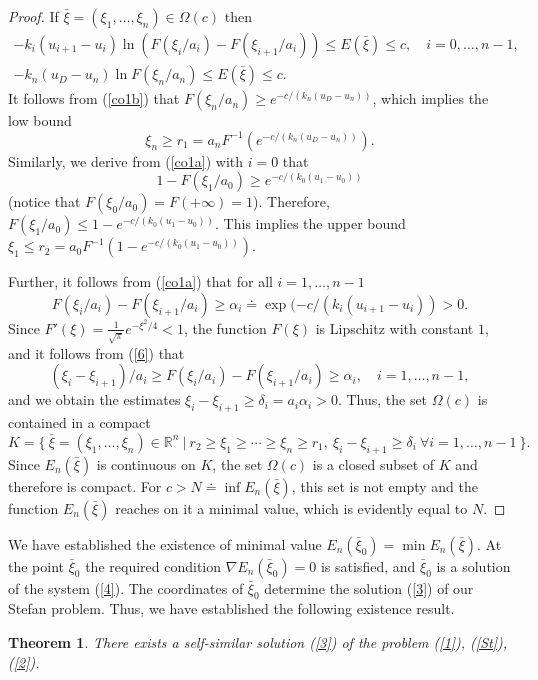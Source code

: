 \documentclass[10pt,a4paper]{amsart}
\newtheorem{theorem}{Theorem}[section]
\numberwithin{equation}{section}
\newcommand{\R}{{\mathbb R}}
\begin{document}
\begin{proof}
If $\bar\xi=(\xi_1,\ldots,\xi_n)\in\Omega(c)$ then
\begin{align}\label{co1a}
 -k_i(u_{i+1}-u_i)\ln (F(\xi_i/a_i)-F(\xi_{i+1}/a_i))\le E(\bar\xi)\le c, \quad i=0,\ldots,n-1, \\
 \label{co1b}
-k_n(u_D-u_n)\ln F(\xi_n/a_n)\le E(\bar\xi)\le c.
 \end{align}
It follows from (\ref{co1b}) that $F(\xi_n/a_n)\ge e^{-c/(k_n(u_D-u_n))}$, which implies
the low bound
\[\xi_n\ge r_1=a_nF^{-1}(e^{-c/(k_n(u_D-u_n))}).\]
Similarly, we derive from (\ref{co1a}) with $i=0$ that
\[1-F(\xi_1/a_0)\ge e^{-c/(k_0(u_1-u_0))}\] (notice that $F(\xi_0/a_0)=F(+\infty)=1$). Therefore,
$F(\xi_1/a_0)\le 1-e^{-c/(k_0(u_1-u_0))}$. This implies the upper bound $\xi_1\le r_2=a_0F^{-1}(1-e^{-c/(k_0(u_1-u_0))})$.

Further, it follows from (\ref{co1a}) that for all $i=1,\ldots,n-1$
\begin{equation}\label{6}
F(\xi_i/a_i)-F(\xi_{i+1}/a_i)\ge \alpha_i\doteq\exp(-c/(k_i(u_{i+1}-u_i))>0.
\end{equation}
Since $F'(\xi)=\frac{1}{\sqrt{\pi}}e^{-\xi^2/4}<1$, the function $F(\xi)$ is Lipschitz with constant $1$, and it follows from (\ref{6}) that
\[
(\xi_i-\xi_{i+1})/a_i\ge F(\xi_i/a_i)-F(\xi_{i+1}/a_i)\ge \alpha_i, \quad i=1,\ldots,n-1,
\]
and we obtain the estimates $\xi_i-\xi_{i+1}\ge\delta_i=a_i\alpha_i>0$. Thus, the set $\Omega(c)$ is contained in a compact
\[
K=\{ \ \bar\xi=(\xi_1,\ldots,\xi_n)\in\R^n \ | \ r_2\ge\xi_1\ge\cdots\ge\xi_n\ge r_1, \ \xi_i-\xi_{i+1}\ge\delta_i \ \forall i=1,\ldots,n-1 \ \}.
\]
Since $E_n(\bar\xi)$ is continuous on $K$, the set $\Omega(c)$ is a closed subset of $K$ and therefore is compact. For $c>N\doteq\inf E_n(\bar\xi)$, this set is not empty and the function $E_n(\bar\xi)$ reaches on it a minimal value, which is evidently equal to $N$.
\end{proof}

We have established the existence of minimal value $E_n(\bar\xi_0)=\min E_n(\bar\xi)$. At the point $\bar\xi_0$ the required condition $\nabla E_n(\bar\xi_0)=0$ is satisfied, and $\bar\xi_0$ is a solution of the system (\ref{4}). The coordinates
of $\bar\xi_0$ determine the solution (\ref{3}) of our Stefan problem. Thus, we have established the following existence result.

\begin{theorem}\label{th1a}
There exists a self-similar solution (\ref{3}) of the problem (\ref{1}), (\ref{St}), (\ref{2}).
\end{theorem}
\end{document}
